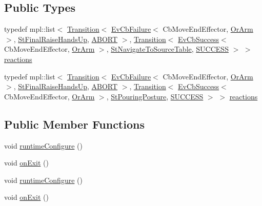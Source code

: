 \subsection*{Public Types}
\begin{DoxyCompactItemize}
\item 
typedef mpl\+::list$<$ \hyperlink{classsmacc_1_1Transition}{Transition}$<$ \hyperlink{structsmacc_1_1EvCbFailure}{Ev\+Cb\+Failure}$<$ Cb\+Move\+End\+Effector, \hyperlink{classsm__moveit__wine__serve_1_1OrArm}{Or\+Arm} $>$, \hyperlink{structsm__moveit__wine__serve_1_1StFinalRaiseHandsUp}{St\+Final\+Raise\+Hands\+Up}, \hyperlink{structsmacc_1_1default__transition__tags_1_1ABORT}{A\+B\+O\+RT} $>$, \hyperlink{classsmacc_1_1Transition}{Transition}$<$ \hyperlink{structsmacc_1_1EvCbSuccess}{Ev\+Cb\+Success}$<$ Cb\+Move\+End\+Effector, \hyperlink{classsm__moveit__wine__serve_1_1OrArm}{Or\+Arm} $>$, \hyperlink{structsm__moveit__wine__serve_1_1StNavigateToSourceTable}{St\+Navigate\+To\+Source\+Table}, \hyperlink{structsmacc_1_1default__transition__tags_1_1SUCCESS}{S\+U\+C\+C\+E\+SS} $>$ $>$ \hyperlink{structsm__moveit__wine__serve_1_1StInitialPosture_a2fa5fcc86ed1b9262a87a7438b85b559}{reactions}
\item 
typedef mpl\+::list$<$ \hyperlink{classsmacc_1_1Transition}{Transition}$<$ \hyperlink{structsmacc_1_1EvCbFailure}{Ev\+Cb\+Failure}$<$ Cb\+Move\+End\+Effector, \hyperlink{classsm__moveit__wine__serve_1_1OrArm}{Or\+Arm} $>$, \hyperlink{structsm__moveit__wine__serve_1_1StFinalRaiseHandsUp}{St\+Final\+Raise\+Hands\+Up}, \hyperlink{structsmacc_1_1default__transition__tags_1_1ABORT}{A\+B\+O\+RT} $>$, \hyperlink{classsmacc_1_1Transition}{Transition}$<$ \hyperlink{structsmacc_1_1EvCbSuccess}{Ev\+Cb\+Success}$<$ Cb\+Move\+End\+Effector, \hyperlink{classsm__moveit__wine__serve_1_1OrArm}{Or\+Arm} $>$, \hyperlink{structsm__moveit__wine__serve_1_1StPouringPosture}{St\+Pouring\+Posture}, \hyperlink{structsmacc_1_1default__transition__tags_1_1SUCCESS}{S\+U\+C\+C\+E\+SS} $>$ $>$ \hyperlink{structsm__moveit__wine__serve_1_1StInitialPosture_a651fc981763b91ceb98724147f50d1ad}{reactions}
\end{DoxyCompactItemize}
\subsection*{Public Member Functions}
\begin{DoxyCompactItemize}
\item 
void \hyperlink{structsm__moveit__wine__serve_1_1StInitialPosture_a8c87672b555104fac7d168167f8b5d1b}{runtime\+Configure} ()
\item 
void \hyperlink{structsm__moveit__wine__serve_1_1StInitialPosture_a94e404c92f10702cd8ea8b1299c703d5}{on\+Exit} ()
\item 
void \hyperlink{structsm__moveit__wine__serve_1_1StInitialPosture_a8c87672b555104fac7d168167f8b5d1b}{runtime\+Configure} ()
\item 
void \hyperlink{structsm__moveit__wine__serve_1_1StInitialPosture_a94e404c92f10702cd8ea8b1299c703d5}{on\+Exit} ()
\end{DoxyCompactItemize}
